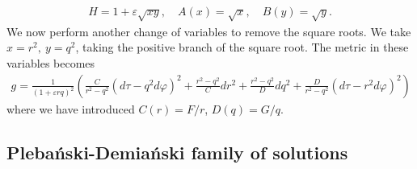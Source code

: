 \documentclass[10pt]{report}
\newcommand{\pleb}[0]{Pleba\'nski}
\newcommand{\demi}[0]{Demia\'nski}
\theoremstyle{definition}
\begin{document}
\begin{align}
    H = 1+\varepsilon \sqrt{xy}, \quad A(x) = \sqrt{x}, \quad B(y) = \sqrt{y}.
\end{align}
We now perform another change of variables to remove the square roots. We take $x = r^2,\ y = q^2$, taking the positive branch of the square root.
The metric in these variables becomes 
\begin{align}
    g = \frac{1}{(1+\varepsilon rq)^2} \left( \frac{C}{r^2-q^2}(d\tau-q^2 d\varphi)^2 + \frac{r^2-q^2}{C} dr^2 + \frac{r^2-q^2}{D}dq^2 + \frac{D}{r^2-q^2} (d\tau-r^2 d\varphi)^2 \right) \label{eq:PlebanskiDemianskiMetric}
\end{align}
where we have introduced $C(r) = F/r$, $D(q) = G/q$.

\subsection{\pleb{}-\demi{} family of solutions}
\end{document}
